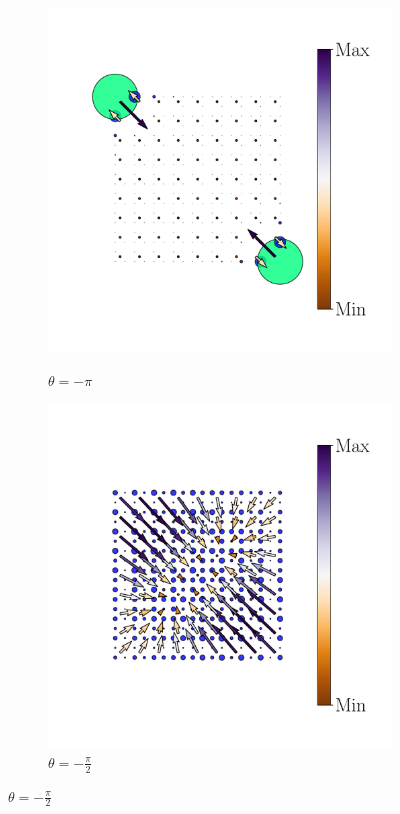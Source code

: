 \begin{figure}[h!]
     \centering
    \captionsetup[sub]{font=small}
     \begin{minipage}[h!]{1.1\textwidth}
         \begin{subfigure}[b!]{0.2 \textwidth}
             \caption{$\theta = -\pi$}
             \includegraphics[width=\textwidth]{Imagenes/Resultados_pump_Cuadrado/xy/hoti_pomp_xy_pos1.pdf}
             \label{}
         \end{subfigure}\hspace*{-0.5em}
          \begin{subfigure}[b!]{0.2 \textwidth}
             \caption*{$\theta = -\frac{\pi}{2}$}
             \includegraphics[width=\textwidth]{Imagenes/Resultados_pump_Cuadrado/xy/hoti_pomp_xy_pos2.pdf}

\end{subfigure}
\end{minipage}
\end{figure}
